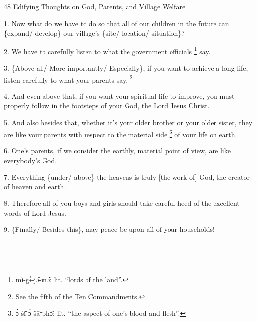 
48 Edifying Thoughts on God, Parents, and Village Welfare

1. Now what do we have to do so that all of our children in the future can \{expand/
develop\} our village's \{site/ location/ situation\}?

2. We have to carefully listen to what the government officials \footnote{mì-gɨ̀꞊jɔ̂-mɔ̂: lit. ``lords of the land''.} say.

3. \{Above all/ More importantly/ Especially\}, if you want to achieve a long life,
listen carefully to what your parents say. \footnote{See the fifth of the Ten Commandments.}

4. And even above that, if you want your spiritual life to improve, you must properly
follow in the footsteps of your God, the Lord Jesus Christ.

5. And also besides that, whether it's your older brother or your older sister,
they are like your parents with respect to the material side \footnote{ɔ̀-šɨ̄-ɔ̀-šā꞊phɔ̂: lit. ``the aspect of one's blood and flesh''.} of your life on
earth.

6. One's parents, if we consider the earthly, material point of view, are like
everybody's God.

7. Everything \{under/ above\} the heavens is truly [the work of] God, the creator
of heaven and earth.

8. Therefore all of you boys and girls should take careful heed of the excellent
words of Lord Jesus.

9. \{Finally/ Besides this\}, may peace be upon all of your households!

---------------------------------------------------------------------------------------------------------------

